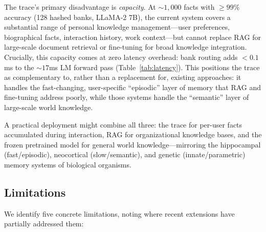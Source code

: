 \documentclass[11pt,a4paper]{article}
\begin{document}
The trace's primary disadvantage is \emph{capacity}. At ${\sim}1{,}000$ facts with ${\geq}99\%$ accuracy (128 hashed banks, LLaMA-2 7B), the current system covers a substantial range of personal knowledge management---user preferences, biographical facts, interaction history, work context---but cannot replace RAG for large-scale document retrieval or fine-tuning for broad knowledge integration. Crucially, this capacity comes at zero latency overhead: bank routing adds $<0.1$ms to the ${\sim}17$ms LM forward pass (Table~\ref{tab:latency}). This positions the trace as complementary to, rather than a replacement for, existing approaches: it handles the fast-changing, user-specific ``episodic'' layer of memory that RAG and fine-tuning address poorly, while those systems handle the ``semantic'' layer of large-scale world knowledge.

A practical deployment might combine all three: the trace for per-user facts accumulated during interaction, RAG for organizational knowledge bases, and the frozen pretrained model for general world knowledge---mirroring the hippocampal (fast/episodic), neocortical (slow/semantic), and genetic (innate/parametric) memory systems of biological organisms.

\subsection{Limitations}

We identify five concrete limitations, noting where recent extensions have partially addressed them:
\end{document}
